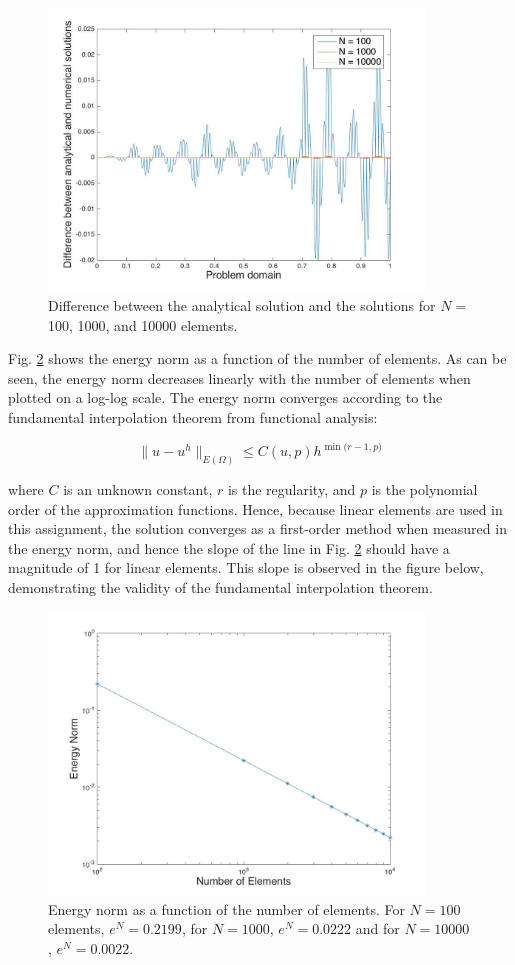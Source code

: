 \documentclass[10pt]{article}
\begin{document}
\begin{figure}[H]
  \centering
  \includegraphics[width=10cm]{Nplot2.jpg}
  \caption{Difference between the analytical solution and the solutions for \(N=\) 100, 1000, and 10000 elements.}
  \label{fig:NodalValues2}
\end{figure}

Fig. \ref{fig:eN_vs_N} shows the energy norm as a function of the number of elements. As can be seen, the energy norm decreases linearly with the number of elements when plotted on a log-log scale. The energy norm converges according to the fundamental interpolation theorem from functional analysis:

\begin{equation}
\label{eq:Theorem}
\|u-u^h\|_{E(\Omega)}\leq C(u, p)h^{\min{(r-1, p})}
\end{equation}

where \(C\) is an unknown constant, \(r\) is the regularity, and \(p\) is the polynomial order of the approximation functions. Hence, because linear elements are used in this assignment, the solution converges as a first-order method when measured in the energy norm, and hence the slope of the line in Fig. \ref{fig:eN_vs_N} should have a magnitude of 1 for linear elements. This slope is observed in the figure below, demonstrating the validity of the fundamental interpolation theorem.

\begin{figure}[H]
  \centering
  \includegraphics[width=10cm]{eN_vs_N.jpg}
  \caption{Energy norm as a function of the number of elements. For \(N=100\) elements, \(e^N=0.2199\), for \(N=1000\), \(e^N=0.0222\) and for \(N=10000\), \(e^N=0.0022\).}
  \label{fig:eN_vs_N}
\end{figure}
\end{document}
